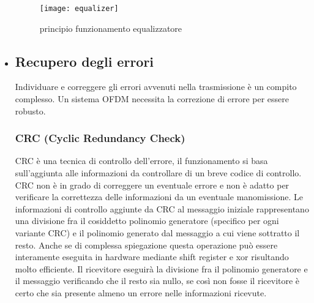 \begin{itemize}
     \begin{figure}[h]
     	\centering
     	\texttt{[image: equalizer]}
     	\caption{principio funzionamento equalizzatore \cite{equalizer}}\label{fig:1}
     \end{figure}
 \newpage
 \item \subsection{Recupero degli errori} Individuare e correggere gli errori avvenuti nella trasmissione è un compito complesso. Un sistema OFDM necessita la correzione di errore per essere robusto.
 \subsubsection{CRC (Cyclic Redundancy Check)}
 CRC è una tecnica di controllo dell'errore, il funzionamento si basa sull'aggiunta alle informazioni da controllare di un breve codice di controllo. CRC non è in grado di correggere un eventuale errore e non è adatto per verificare la correttezza delle informazioni da un eventuale manomissione. Le informazioni di controllo aggiunte da CRC al messaggio iniziale rappresentano una divisione fra il cosiddetto polinomio generatore (specifico per ogni variante CRC) e il polinomio generato dal messaggio a cui viene sottratto il resto. Anche se di complessa spiegazione questa operazione può essere interamente eseguita in hardware mediante shift register e xor  risultando molto efficiente. Il ricevitore eseguirà la divisione fra il polinomio generatore e il messaggio verificando che il resto sia nullo, se così non fosse il ricevitore è certo che sia presente almeno un errore nelle informazioni ricevute. \cite{crc}
 

\end{itemize}
